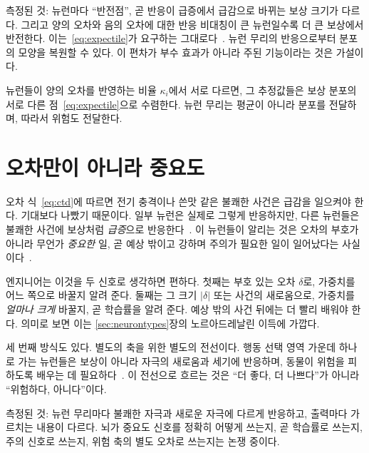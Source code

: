 측정된 것:  뉴런마다 “반전점”, 곧 반응이 급증에서 급감으로 바뀌는 보상 크기가 다르다. 그리고 양의 오차와 음의 오차에 대한 반응 비대칭이 큰 뉴런일수록 더 큰 보상에서 반전한다. 이는~\eqref{eq:expectile}가 요구하는 그대로다~\cite{Dabney2020}. 뉴런 무리의 반응으로부터 분포의 모양을 복원할 수 있다. 이 편차가 부수 효과가 아니라 주된 기능이라는 것은 가설이다.

\begin{keyblock}
\begin{proposition}
\label{prop:expectile}
 뉴런들이 양의 오차를 반영하는 비율 $\kappa_i$에서 서로 다르면, 그 추정값들은 보상 분포의 서로 다른 점~\eqref{eq:expectile}으로 수렴한다. 뉴런 무리는 평균이 아니라 분포를 전달하며, 따라서 위험도 전달한다.
\end{proposition}
\end{keyblock}

\section{오차만이 아니라 중요도}

오차 식~\eqref{eq:ctd}에 따르면 전기 충격이나 쓴맛 같은 불쾌한 사건은 급감을 일으켜야 한다. 기대보다 나빴기 때문이다. 일부  뉴런은 실제로 그렇게 반응하지만, 다른 뉴런들은 불쾌한 사건에 보상처럼 \emph{급증}으로 반응한다~\cite{Matsumoto2009}. 이 뉴런들이 알리는 것은 오차의 부호가 아니라 무언가 \emph{중요한} 일, 곧 예상 밖이고 강하며 주의가 필요한 일이 일어났다는 사실이다~\cite{BrombergMartin2010}.

엔지니어는 이것을 두 신호로 생각하면 편하다. 첫째는 부호 있는 오차 $\delta$로, 가중치를 어느 쪽으로 바꿀지 알려 준다. 둘째는 그 크기 $|\delta|$ 또는 사건의 새로움으로, 가중치를 \emph{얼마나 크게} 바꿀지, 곧 학습률을 알려 준다. 예상 밖의 사건 뒤에는 더 빨리 배워야 한다. 의미로 보면 이는 \ref{sec:neurontypes}장의 노르아드레날린 이득에 가깝다.

세 번째 방식도 있다. 별도의 축을 위한 별도의 전선이다. 행동 선택 영역 가운데 하나로 가는  뉴런들은 보상이 아니라 자극의 새로움과 세기에 반응하며, 동물이 위험을 피하도록 배우는 데 필요하다~\cite{Menegas2018}. 이 전선으로 흐르는 것은 “더 좋다, 더 나쁘다”가 아니라 “위험하다, 아니다”이다.

측정된 것:  뉴런 무리마다 불쾌한 자극과 새로운 자극에 다르게 반응하고, 출력마다 가르치는 내용이 다르다. 뇌가 중요도 신호를 정확히 어떻게 쓰는지, 곧 학습률로 쓰는지, 주의 신호로 쓰는지, 위험 축의 별도 오차로 쓰는지는 논쟁 중이다.

